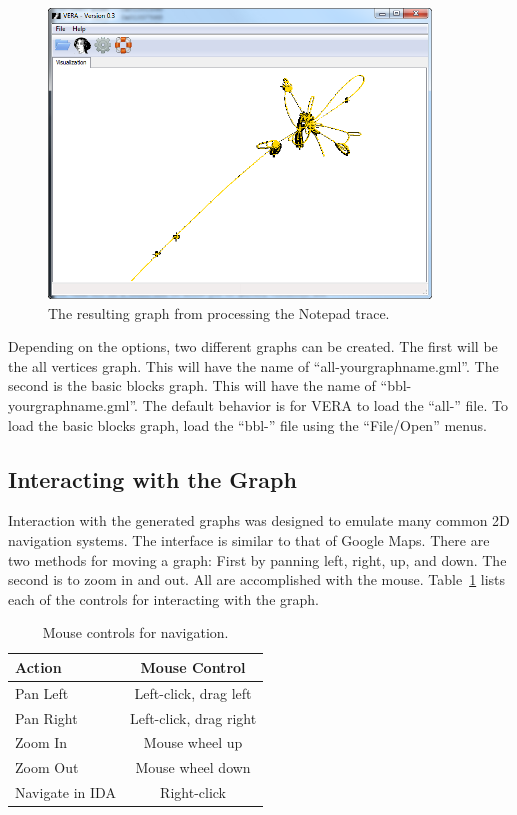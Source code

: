 \documentclass[11pt]{article}
\begin{document}
\begin{figure}[htb]
  \centering
  \includegraphics[width=4.0in]{vera-notepad-trace.png}
  \caption{The resulting graph from processing the Notepad trace.}\label{vera:notepad-trace}
\end{figure}

Depending on the options, two different graphs can be created. The
first will be the all vertices graph. This will have the name of
``all-yourgraphname.gml''. The second is the basic blocks graph. This will
have the name of ``bbl-yourgraphname.gml''. The default behavior is for
VERA to load the ``all-'' file. To load the basic blocks graph, load the ``bbl-'' file using the ``File/Open'' menus.


\subsection{Interacting with the Graph}

Interaction with the generated graphs was designed to emulate many
common 2D navigation systems. The interface is similar to that of Google Maps. There are two methods for moving a graph: First by panning left, right, up, and down. The second is to zoom in and out. All are accomplished with the mouse. Table~\ref{table:controls} lists each of the controls for interacting with the graph.

\begin{table}[htb]
\centering
\begin{tabular}{ | l | c | }
\hline
\bf{Action} & \bf{Mouse Control}\\
\hline
Pan Left & Left-click, drag left \\
Pan Right & Left-click, drag right \\
Zoom In & Mouse wheel up \\
Zoom Out & Mouse wheel down \\
Navigate in IDA & Right-click \\
\hline

\end{tabular}\caption{Mouse controls for navigation.}\label{table:controls}
\end{table}
\end{document}
